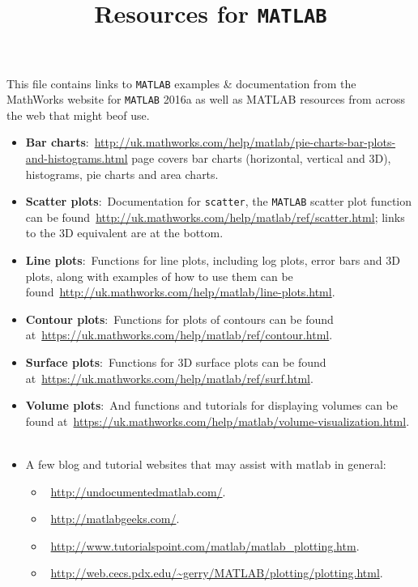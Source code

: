 \documentclass[a4paper]{article}
\title{Resources for \texttt{MATLAB}}
\begin{document}
    \maketitle
    This file contains links to \texttt{MATLAB} examples \& documentation from the MathWorks website for \texttt{MATLAB} 2016a as well as MATLAB resources from across the web that might beof use.\\

    \begin{itemize}
        \item \textbf{Bar charts}:~\url{http://uk.mathworks.com/help/matlab/pie-charts-bar-plots-and-histograms.html} page covers bar charts (horizontal, vertical and 3D), histograms, pie charts and area charts.\\
        \item \textbf{Scatter plots}:~Documentation for \texttt{scatter}, the \texttt{MATLAB} scatter plot function can be found\ \url{http://uk.mathworks.com/help/matlab/ref/scatter.html}; links to the 3D equivalent are at the bottom.\\
        \item \textbf{Line plots}:~Functions for line plots, including log plots, error bars and 3D plots, along with examples of how to use them can be found\ \url{http://uk.mathworks.com/help/matlab/line-plots.html}.\\
        \item \textbf{Contour plots}:~Functions for plots of contours can be found at\ \url{https://uk.mathworks.com/help/matlab/ref/contour.html}.\\
        \item \textbf{Surface plots}:~Functions for 3D surface plots can be found at\ \url{https://uk.mathworks.com/help/matlab/ref/surf.html}.\\
        \item \textbf{Volume plots}:~And functions and tutorials for displaying volumes can be found at\ \url{https://uk.mathworks.com/help/matlab/volume-visualization.html}.\\
        \\
        \item A few blog and tutorial websites that may assist with matlab in general:
        \begin{itemize}
            \item\ \url{http://undocumentedmatlab.com/}.\\
            \item\ \url{http://matlabgeeks.com/}.\\
            \item\ \url{http://www.tutorialspoint.com/matlab/matlab_plotting.htm}.\\
            \item\ \url{http://web.cecs.pdx.edu/~gerry/MATLAB/plotting/plotting.html}.\\
        \end{itemize}
    \end{itemize}
\end{document}
